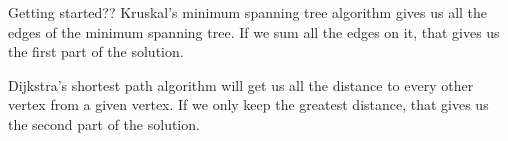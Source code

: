 \documentclass{writeup}
\begin{document}
\begin{solutions}
  \begin{solution}{Getting started}{?}{?}
    Kruskal's minimum spanning tree algorithm gives us all the edges of the minimum spanning tree.
    If we sum all the edges on it, that gives us the first part of the solution.


    Dijkstra's shortest path algorithm will get us all the distance to every other vertex from a given vertex.
    If we only keep the greatest distance, that gives us the second part of the solution.
  \end{solution}
\end{solutions}
\end{document}
